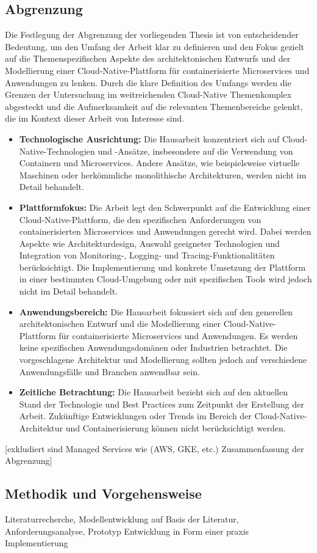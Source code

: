 \subsection{Abgrenzung}
Die Festlegung der Abgrenzung der vorliegenden Thesis ist von entscheidender Bedeutung, um den Umfang der Arbeit klar zu definieren und den Fokus gezielt auf die Themenspezifischen Aspekte des architektonischen Entwurfs und der Modellierung einer Cloud-Native-Plattform für containerisierte Microservices und Anwendungen zu lenken. Durch die klare Definition des Umfangs werden die Grenzen der Untersuchung im weitreichenden Cloud-Native Themenkomplex abgesteckt und die Aufmerksamkeit auf die relevanten Themenbereiche gelenkt, die im Kontext dieser Arbeit von Interesse sind.
\begin{itemize}
	\item  \textbf{Technologische Ausrichtung:} Die Hausarbeit konzentriert sich auf Cloud-Native-Technologien und -Ansätze, insbesondere auf die Verwendung von Containern und Microservices. Andere Ansätze, wie beispielsweise virtuelle Maschinen oder herkömmliche monolithische Architekturen, werden nicht im Detail behandelt.
	\item \textbf{Plattformfokus:} Die Arbeit legt den Schwerpunkt auf die Entwicklung einer Cloud-Native-Plattform, die den spezifischen Anforderungen von containerisierten Microservices und Anwendungen gerecht wird. Dabei werden Aspekte wie Architekturdesign, Auswahl geeigneter Technologien und Integration von Monitoring-, Logging- und Tracing-Funktionalitäten berücksichtigt. Die Implementierung und konkrete Umsetzung der Plattform in einer bestimmten Cloud-Umgebung oder mit spezifischen Tools wird jedoch nicht im Detail behandelt.
	\item \textbf{Anwendungsbereich:} Die Hausarbeit fokussiert sich auf den generellen architektonischen Entwurf und die Modellierung einer Cloud-Native-Plattform für containerisierte Microservices und Anwendungen. Es werden keine spezifischen Anwendungsdomänen oder Industrien betrachtet. Die vorgeschlagene Architektur und Modellierung sollten jedoch auf verschiedene Anwendungsfälle und Branchen anwendbar sein.
	\item \textbf{Zeitliche Betrachtung:} Die Hausarbeit bezieht sich auf den aktuellen Stand der Technologie und Best Practices zum Zeitpunkt der Erstellung der Arbeit. Zukünftige Entwicklungen oder Trends im Bereich der Cloud-Native-Architektur und Containerisierung können nicht berücksichtigt werden.
\end{itemize}

[exkludiert sind Managed Services wie (AWS, GKE, etc.) Zusammenfassung der Abgrenzung]

\subsection{Methodik und Vorgehensweise}
Literaturrecherche, Modellentwicklung auf Basis der Literatur, Anforderungsanalyse, Prototyp Entwicklung in Form einer praxis Implementierung